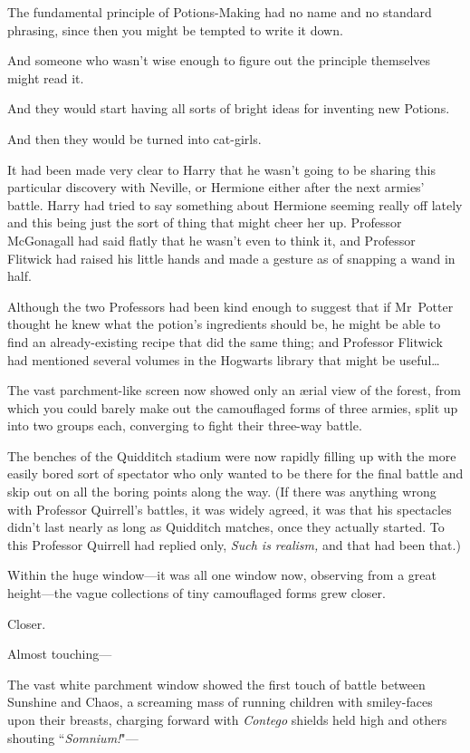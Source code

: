 The fundamental principle of Potions-Making had no name and no standard phrasing, since then you might be tempted to write it down.

And someone who wasn't wise enough to figure out the principle themselves might read it.

And they would start having all sorts of bright ideas for inventing new Potions.

And then they would be turned into cat-girls.

It had been made very clear to Harry that he wasn't going to be sharing this particular discovery with Neville, or Hermione either after the next armies' battle. Harry had tried to say something about Hermione seeming really off lately and this being just the sort of thing that might cheer her up. Professor McGonagall had said flatly that he wasn't even to think it, and Professor Flitwick had raised his little hands and made a gesture as of snapping a wand in half.

Although the two Professors had been kind enough to suggest that if Mr~Potter thought he knew what the potion's ingredients should be, he might be able to find an already-existing recipe that did the same thing; and Professor Flitwick had mentioned several volumes in the Hogwarts library that might be useful…

\later

The vast parchment-like screen now showed only an ærial view of the forest, from which you could barely make out the camouflaged forms of three armies, split up into two groups each, converging to fight their three-way battle.

The benches of the Quidditch stadium were now rapidly filling up with the more easily bored sort of spectator who only wanted to be there for the final battle and skip out on all the boring points along the way. (If there was anything wrong with Professor Quirrell's battles, it was widely agreed, it was that his spectacles didn't last nearly as long as Quidditch matches, once they actually started. To this Professor Quirrell had replied only, \emph{Such is realism,} and that had been that.)

Within the huge window—it was all one window now, observing from a great height—the vague collections of tiny camouflaged forms grew closer.

Closer.

Almost touching—

\later

The vast white parchment window showed the first touch of battle between Sunshine and Chaos, a screaming mass of running children with smiley-faces upon their breasts, charging forward with \emph{Contego} shields held high and others shouting ``\emph{Somnium!}"—

